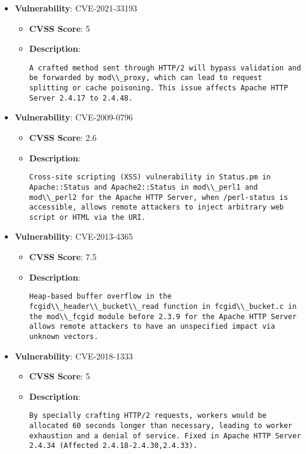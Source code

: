 \documentclass{article}
\begin{document}
\begin{itemize}
        \item \textbf{Vulnerability}: CVE-2021-33193
        \begin{itemize}
            \item \textbf{CVSS Score}:  5 
            \item \textbf{Description}:
            \parbox[t]{0.9\linewidth}{
                \verb|A crafted method sent through HTTP/2 will bypass validation and be forwarded by mod\\_proxy, which can lead to request splitting or cache poisoning. This issue affects Apache HTTP Server 2.4.17 to 2.4.48.|
            }
        \end{itemize}
    
        \item \textbf{Vulnerability}: CVE-2009-0796
        \begin{itemize}
            \item \textbf{CVSS Score}:  2.6 
            \item \textbf{Description}:
            \parbox[t]{0.9\linewidth}{
                \verb|Cross-site scripting (XSS) vulnerability in Status.pm in Apache::Status and Apache2::Status in mod\\_perl1 and mod\\_perl2 for the Apache HTTP Server, when /perl-status is accessible, allows remote attackers to inject arbitrary web script or HTML via the URI.|
            }
        \end{itemize}
    
        \item \textbf{Vulnerability}: CVE-2013-4365
        \begin{itemize}
            \item \textbf{CVSS Score}:  7.5 
            \item \textbf{Description}:
            \parbox[t]{0.9\linewidth}{
                \verb|Heap-based buffer overflow in the fcgid\\_header\\_bucket\\_read function in fcgid\\_bucket.c in the mod\\_fcgid module before 2.3.9 for the Apache HTTP Server allows remote attackers to have an unspecified impact via unknown vectors.|
            }
        \end{itemize}
    
        \item \textbf{Vulnerability}: CVE-2018-1333
        \begin{itemize}
            \item \textbf{CVSS Score}:  5 
            \item \textbf{Description}:
            \parbox[t]{0.9\linewidth}{
                \verb|By specially crafting HTTP/2 requests, workers would be allocated 60 seconds longer than necessary, leading to worker exhaustion and a denial of service. Fixed in Apache HTTP Server 2.4.34 (Affected 2.4.18-2.4.30,2.4.33).|
            }
        \end{itemize}
    

\end{itemize}
\end{document}
